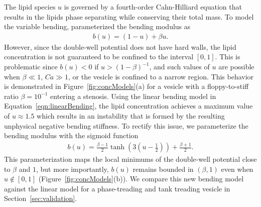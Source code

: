 \documentclass[twoside,twocolumn,9pt]{article}
\begin{document}
The lipid species $u$ is governed by a fourth-order Cahn-Hilliard
equation that results in the lipids phase separating while conserving
their total mass. To model the variable bending,
\citet{soh-tse-li-voi-low2010} parameterized the bending modulus as
\begin{align}
  \label{eqn:linearBending}
  b(u) = (1-u) + \beta u.
\end{align}
However, since the double-well potential does not have hard walls, the
lipid concentration is not guaranteed to be confined to the interval
$[0,1]$. This is problematic since $b(u) < 0$ if $u > (1 - \beta)^{-1}$,
and such values of $u$ are possible when $\beta \ll 1$, $Ca \gg 1$, or
the vesicle is confined to a narrow region. This behavior is
demonstrated in Figure~\ref{fig:concModels}(a) for a vesicle with a
floppy-to-stiff ratio $\beta = 10^{-1}$ entering a stenosis. Using the
linear bending model in Equation~\eqref{eqn:linearBending}, the lipid
concentration achieves a maximum value of $u \approx 1.5$ which results
in an instability that is formed by the resulting unphysical negative
bending stiffness. To rectify this issue, we parameterize the bending
modulus with the sigmoid function
\begin{align}
  b(u) = \frac{\beta-1}{2} \tanh\left(3\left(u-\frac{1}{2} 
    \right)\right) + \frac{\beta + 1}{2}.
  \label{eqn:tanhBending}
\end{align}
This parameterization maps the local minimums of the double-well
potential close to $\beta$ and $1$, but more importantly, $b(u)$ remains
bounded in $(\beta,1)$ even when $u \notin [0,1]$
(Figure~\ref{fig:concModels}(b)). We compare this new bending model against the linear model for 
a phase-treading and tank treading vesicle in Section~\ref{sec:validation}.

\end{document}
